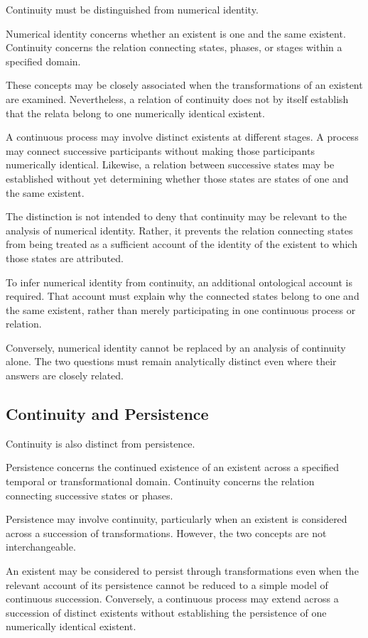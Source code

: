 Continuity must be distinguished from numerical
identity.

Numerical identity concerns whether an existent
is one and the same existent. Continuity concerns
the relation connecting states, phases, or stages
within a specified domain.

These concepts may be closely associated when
the transformations of an existent are examined.
Nevertheless, a relation of continuity does not
by itself establish that the relata belong to
one numerically identical existent.

A continuous process may involve distinct
existents at different stages. A process may
connect successive participants without making
those participants numerically identical.
Likewise, a relation between successive states
may be established without yet determining
whether those states are states of one and the
same existent.

The distinction is not intended to deny that
continuity may be relevant to the analysis of
numerical identity. Rather, it prevents the
relation connecting states from being treated
as a sufficient account of the identity of
the existent to which those states are attributed.

To infer numerical identity from continuity,
an additional ontological account is required.
That account must explain why the connected
states belong to one and the same existent,
rather than merely participating in one
continuous process or relation.

Conversely, numerical identity cannot be
replaced by an analysis of continuity alone.
The two questions must remain analytically
distinct even where their answers are
closely related.

\subsection{Continuity and Persistence}

Continuity is also distinct from persistence.

Persistence concerns the continued existence
of an existent across a specified temporal
or transformational domain. Continuity
concerns the relation connecting successive
states or phases.

Persistence may involve continuity, particularly
when an existent is considered across a succession
of transformations. However, the two concepts
are not interchangeable.

An existent may be considered to persist through
transformations even when the relevant account
of its persistence cannot be reduced to a simple
model of continuous succession. Conversely,
a continuous process may extend across a
succession of distinct existents without
establishing the persistence of one numerically
identical existent.

